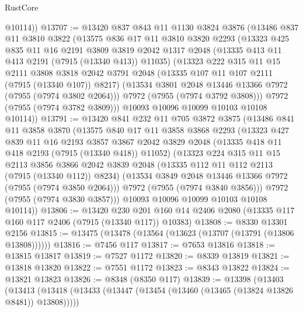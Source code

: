 \begin{lexlean}{RustCore}
\begin{coremodule}
        @10114))
@13707 := @13420
    @837
    @843
    @11
    @1130
    @3824
    @3876
    (@13486
      @837
      @11
      @3810
      @3822
      (@13575
        @836
        @17
        @11
        @3810
        @3820
        @2293
        (@13323
          @425
          @835
          @11
          @16
          @2191
          @3809
          @3819
          @2042
          @1317
          @2048
          (@13335 @413 @11 @413 @2191 (@7915 (@13340 @413)) @11035)
          (@13323
            @222
            @315
            @11
            @15
            @2111
            @3808
            @3818
            @2042
            @3791
            @2048
            (@13335 @107 @11 @107 @2111 (@7915 (@13340 @107)) @8217)
            (@13534 @3801 @2048 @13446 @13366 @7972 (@7955 (@7974 @3802 @2064)))
            @7972
            (@7955 (@7974 @3792 @3808)))
          @7972
          (@7955 (@7974 @3782 @3809)))
        @10093
        @10096
        @10099
        @10103
        @10108
        @10114))
@13791 := @13420
    @841
    @232
    @11
    @705
    @3872
    @3875
    (@13486
      @841
      @11
      @3858
      @3870
      (@13575
        @840
        @17
        @11
        @3858
        @3868
        @2293
        (@13323
          @427
          @839
          @11
          @16
          @2193
          @3857
          @3867
          @2042
          @3829
          @2048
          (@13335 @418 @11 @418 @2193 (@7915 (@13340 @418)) @11052)
          (@13323
            @224
            @315
            @11
            @15
            @2113
            @3856
            @3866
            @2042
            @3839
            @2048
            (@13335 @112 @11 @112 @2113 (@7915 (@13340 @112)) @8234)
            (@13534 @3849 @2048 @13446 @13366 @7972 (@7955 (@7974 @3850 @2064)))
            @7972
            (@7955 (@7974 @3840 @3856)))
          @7972
          (@7955 (@7974 @3830 @3857)))
        @10093
        @10096
        @10099
        @10103
        @10108
        @10114))
@13806 := @13420
    @230
    @201
    @160
    @14
    @2406
    @2080
    (@13335 @117 @160 @117 @2406 (@7915 (@13340 @117)) @10383)
@13808 := @8330 @13301 @2156
@13815 := @13475 (@13478 (@13564 (@13623 (@13707 (@13791 (@13806 @13808))))))
@13816 := @7456 @117
@13817 := @7653 @13816
@13818 := @13815 @13817
@13819 := @7527 @1172
@13820 := @8339 @13819
@13821 := @13818 @13820
@13822 := @7551 @1172
@13823 := @8343 @13822
@13824 := @13821 @13823
@13826 := @8348 (@8350 @117)
@13839 := @13398
    (@13403
      (@13413
        (@13418 (@13433 (@13447 (@13454 (@13460 (@13465 (@13824 @13826 @8481)) @13808)))))

\end{coremodule}
\end{lexlean}
